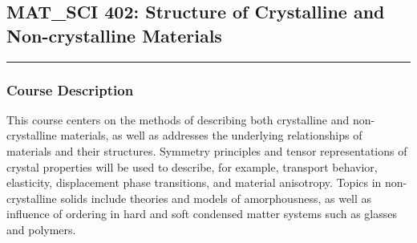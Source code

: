 	\subsection{MAT{\_}SCI 402: Structure of Crystalline and Non-crystalline Materials}
	\vspace{-0.5em} \hfill \rule{0.4\textwidth}{.4pt}\newline
	\null \hfill {} \newline
	\null \hfill {}
\normalfont
	\subsubsection*{Course Description}
	This course centers on the methods of describing both crystalline and non-crystalline materials, as well as addresses the underlying relationships of materials and their structures. Symmetry principles and tensor representations of crystal properties will be used to describe, for example, transport behavior, elasticity, displacement phase transitions, and material anisotropy. Topics in non-crystalline solids include theories and models of amorphousness, as well as influence of ordering in hard and soft condensed matter systems such as glasses and polymers.
